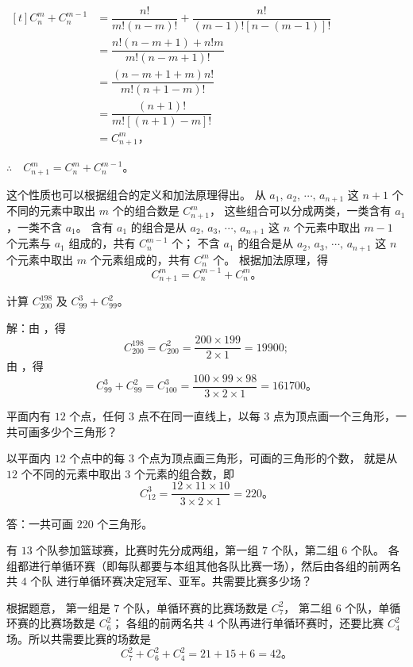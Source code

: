 \zhengming \quad $\begin{aligned}[t]
    C_n^m + C_n^{m-1} &= \dfrac{n!}{m! (n-m)!} + \dfrac{n!}{(m-1)! [n - (m-1)]!} \\
        &= \dfrac{n! (n-m+1) + n! m}{m! (n-m+1)!} \\
        &= \dfrac{(n-m+1+m) n!}{m! (n+1-m)!} \\
        &= \dfrac{(n+1)!}{m! [(n+1) - m]!} \\
        &= C_{n+1}^m \text{，}
\end{aligned}$

$\therefore \quad C_{n+1}^m = C_n^m + C_n^{m-1}$。


这个性质也可以根据组合的定义和加法原理得出。
从 $a_1,\, a_2,\, \cdots,\, a_{n+1}$ 这 $n+1$ 个不同的元素中取出 $m$ 个的组合数是 $C_{n+1}^m$，
这些组合可以分成两类，一类含有 $a_1$，一类不含 $a_1$。
含有 $a_1$ 的组合是从 $a_2,\, a_3,\, \cdots,\, a_{n+1}$ 这 $n$ 个元素中取出 $m-1$ 个元素与 $a_1$ 组成的，共有 $C_n^{m-1}$ 个；
不含 $a_1$ 的组合是从 $a_2,\, a_3,\, \cdots,\, a_{n+1}$ 这 $n$ 个元素中取出 $m$ 个元素组成的，共有 $C_n^m$ 个。
根据加法原理，得
$$ C_{n+1}^m = C_n^{m-1} + C_n^m \text{。} $$


\liti 计算 $C_{200}^{198}$ 及 $C_{99}^3 + C_{99}^2$。

解：由 ，得
$$ C_{200}^{198} = C_{200}^2 = \dfrac{200 \times 199}{2 \times 1} = 19900 ; $$
由 ，得
$$ C_{99}^3 + C_{99}^2 = C_{100}^3 = \dfrac{100 \times 99 \times 98}{3 \times 2 \times 1} = 161700 \text{。} $$



\liti 平面内有 $12$ 个点，任何 $3$ 点不在同一直线上，以每 $3$ 点为顶点画一个三角形，一共可画多少个三角形？

\jie 以平面内 $12$ 个点中的每 $3$ 个点为顶点画三角形，可画的三角形的个数，
就是从 $12$ 个不同的元素中取出 $3$ 个元素的组合数，即
$$ C_{12}^3 = \dfrac{12 \times 11 \times 10}{3 \times 2 \times 1} = 220 \text{。} $$

答：一共可画 $220$ 个三角形。


\liti 有 $13$ 个队参加篮球赛，比赛时先分成两组，第一组 $7$ 个队，第二组 $6$ 个队。
各组都进行单循环赛（即每队都要与本组其他各队比赛一场），然后由各组的前两名共 $4$ 个队
进行单循环赛决定冠军、亚军。共需要比赛多少场？

\jie 根据题意，
第一组是 $7$ 个队，单循环赛的比赛场数是 $C_7^2$，
第二组   $6$ 个队，单循环赛的比赛场数是 $C_6^2$；
各组的前两名共 $4$ 个队再进行单循环赛时，还要比赛 $C_4^2$ 场。所以共需要比赛的场数是
$$ C_7^2 + C_6^2 + C_4^2 = 21 + 15 + 6 = 42 \text{。} $$

